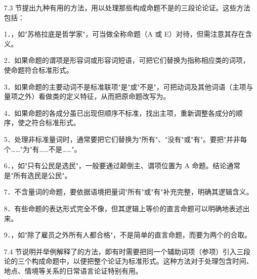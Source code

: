 
7.3 节提出九种有用的方法，用以处理那些构成命题不是的三段论论证。这些方法包括：

1．，如"苏格拉底是哲学家"，可当做全称命题（A 或 E）对待，但需注意其存在含义。

2．如果命题的谓项是形容词或形容词短语，可把它们替换为指称相应类的词项，使命题符合标准形式。

3．如果命题的主要动词不是标准联项"是"或"不是"，可把动词及其他词语（主项与量项之外）看做类的定义特征，从而把原命题改写为。

4．如果命题的各成分虽已出现但顺序不标准，找出主项，重新调整各成分的顺序，使之符合标准形式。

5．处理非标准量词时，通常要把它们替换为"所有"、"没有"或"有"。要把"并非每个……"为"有……不是……"。

6．，如"只有公民是选民"，一般要通过颠倒主、谓项位置为 A 命题。结论通常是"所有选民是公民"。

7．不含量词的命题，要依据语境把量词"所有"或"有"补充完整，明确其逻辑含义。

8．有些命题的表达形式完全不像，但其逻辑上等价的直言命题可以明确地表述出来。

9．，如"除了雇员之外所有人都合格"，不是简单的直言命题，而要为两个的合取。

7.4 节说明并举例解释了的方法，即有时需要把同一个辅助词项（参项）引入三段论的三个构成命题中，以便把整个论证为标准形式。这种方法对于处理包含时间、地点、情境等关系的日常语言论证特别有用。

